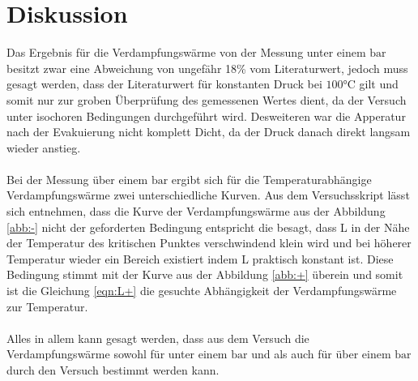 \section{Diskussion}
\label{sec:Diskussion}
Das Ergebnis für die Verdampfungswärme von
der Messung unter einem $\si{\bar}$ besitzt
zwar eine Abweichung von ungefähr
18\% vom Literaturwert, jedoch muss gesagt werden, dass
der Literaturwert für konstanten Druck bei $100\si{\degreeCelsius}$
gilt und somit nur zur groben Überprüfung des gemessenen Wertes dient,
da der Versuch unter isochoren Bedingungen durchgeführt wird.
Desweiteren war die Apperatur nach der Evakuierung nicht komplett Dicht,
da der Druck danach direkt langsam wieder anstieg.\\
\\
Bei der Messung über einem $\si{\bar}$ ergibt sich für die
Temperaturabhängige Verdampfungswärme zwei unterschiedliche
Kurven. Aus dem Versuchsskript\cite{sample} lässt sich entnehmen, dass
die Kurve der Verdampfungswärme aus der Abbildung \ref{abb:-} nicht der
geforderten Bedingung entspricht die besagt, dass  L in der Nähe der
Temperatur des kritischen Punktes verschwindend klein wird und bei höherer
Temperatur wieder ein Bereich existiert indem L praktisch konstant ist.
Diese Bedingung stimmt mit der Kurve aus der Abbildung \ref{abb:+} überein
und  somit ist die Gleichung \eqref{eqn:L+}
die gesuchte Abhängigkeit der Verdampfungswärme zur Temperatur.\\
\\
Alles in allem kann gesagt werden, dass aus dem Versuch die Verdampfungswärme
sowohl für unter einem $\si{\bar}$ und als auch für über einem $\si{\bar}$
durch den Versuch bestimmt werden kann.
